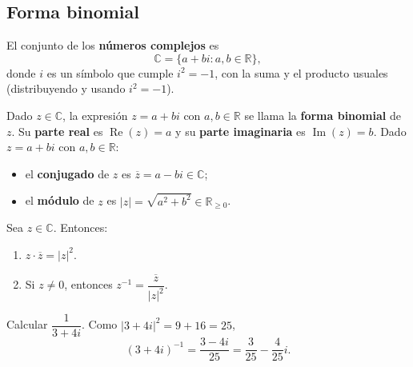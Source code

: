 \subsection{Forma binomial}
\begin{definicion}
El conjunto de los \textbf{números complejos} es
\[
\mathbb{C}=\{a+bi : a,b\in\mathbb{R}\},
\]
donde $i$ es un símbolo que cumple $i^2=-1$, con la suma y el producto
usuales (distribuyendo y usando $i^2=-1$).
\end{definicion}
\begin{definicion}
Dado $z\in\mathbb{C}$, la expresión $z=a+bi$ con $a,b\in\mathbb{R}$ se llama la
\textbf{forma binomial} de $z$. Su \textbf{parte real} es $\operatorname{Re}(z)=a$
y su \textbf{parte imaginaria} es $\operatorname{Im}(z)=b$.
Dado $z=a+bi$ con $a,b\in\mathbb{R}$:
\begin{itemize}
    \item el \textbf{conjugado} de $z$ es $\overline{z}=a-bi\in\mathbb{C}$;
    \item el \textbf{módulo} de $z$ es $|z|=\sqrt{a^2+b^2}\in\mathbb{R}_{\ge 0}$.
\end{itemize}
\end{definicion}
\begin{proposicion}
Sea $z\in\mathbb{C}$. Entonces:
\begin{enumerate}
    \item $z\cdot\overline{z}=|z|^2$.
    \item Si $z\neq 0$, entonces $z^{-1}=\dfrac{\overline{z}}{|z|^2}$.
\end{enumerate}
\end{proposicion}
\begin{ejemplo}
Calcular $\dfrac{1}{3+4i}$. Como $|3+4i|^2=9+16=25$,
\[
(3+4i)^{-1}=\frac{3-4i}{25}=\frac{3}{25}-\frac{4}{25}i.
\]
\end{ejemplo}
